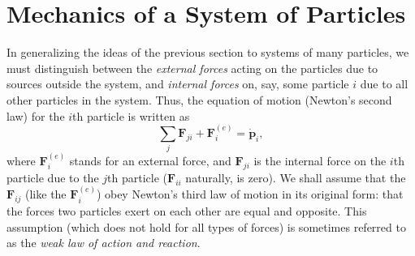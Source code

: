 \section{Mechanics of a System of Particles}

In generalizing the ideas of the previous section to systems of many particles, we must distinguish between the \emph{external forces} acting on the particles due to sources outside the system, and \emph{internal forces} on, say, some particle \(i\) due to all other particles in the system. Thus, the equation of motion (Newton's second law) for the \(i\)th particle is written as
\begin{equation}
    \sum_j\symbf{F}_{ji}+\symbf{F}_i^{\left(e\right)}=\dot{\symbf{p}}_i,\label{eq:1.19}
\end{equation}
where \(\symbf{F}_i^{\left(e\right)}\) stands for an external force, and \(\symbf{F}_{ji}\) is the internal force on the \(i\)th particle due to the \(j\)th particle (\(\symbf{F}_{ii}\) naturally, is zero). We shall assume that the \(\symbf{F}_{ij}\) (like the \(\symbf{F}_i^{\left(e\right)}\)) obey Newton's third law of motion in its original form: that the forces two particles exert on each other are equal and opposite. This assumption (which does not hold for all types of forces) is sometimes referred to as the \emph{weak law of action and reaction}.

